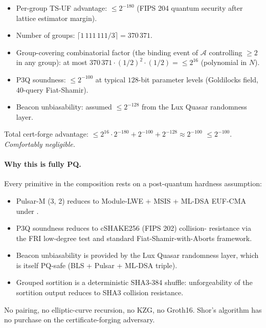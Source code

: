 \begin{itemize}[leftmargin=*, itemsep=0pt]
\item Per-group TS-UF advantage: $\le 2^{-180}$ (FIPS 204 quantum
security after lattice estimator margin).
\item Number of groups: $\lceil 1\,111\,111 / 3 \rceil = 370\,371$.
\item Group-covering combinatorial factor (the binding event of
$\mathcal{A}$ controlling $\ge 2$ in any group): at most
$370\,371 \cdot (1/2)^2 \cdot (1/2) = \le 2^{16}$ (polynomial in $N$).
\item P3Q soundness: $\le 2^{-100}$ at typical $128$-bit parameter
levels (Goldilocks field, $40$-query Fiat-Shamir).
\item Beacon unbiasability: assumed $\le 2^{-128}$ from the Lux
Quasar randomness layer.
\end{itemize}

\noindent Total cert-forge advantage:
$\le 2^{16} \cdot 2^{-180} + 2^{-100} + 2^{-128} \approx 2^{-100}$
$\le 2^{-100}$. \emph{Comfortably negligible.}

\paragraph{Why this is fully PQ.}
Every primitive in the composition rests on a post-quantum hardness
assumption:

\begin{itemize}[leftmargin=*, itemsep=0pt]
\item Pulsar-M (3, 2) reduces to Module-LWE + MSIS + ML-DSA EUF-CMA
under .
\item P3Q soundness reduces to cSHAKE256 (FIPS 202) collision-
resistance via the FRI low-degree test and standard
Fiat-Shamir-with-Aborts framework.
\item Beacon unbiasability is provided by the Lux Quasar
randomness layer, which is itself PQ-safe (BLS + Pulsar + ML-DSA
triple).
\item Grouped sortition is a deterministic SHA3-384 shuffle:
unforgeability of the sortition output reduces to SHA3 collision
resistance.
\end{itemize}

No pairing, no elliptic-curve recursion, no KZG, no Groth16. Shor's
algorithm has no purchase on the certificate-forging adversary.

